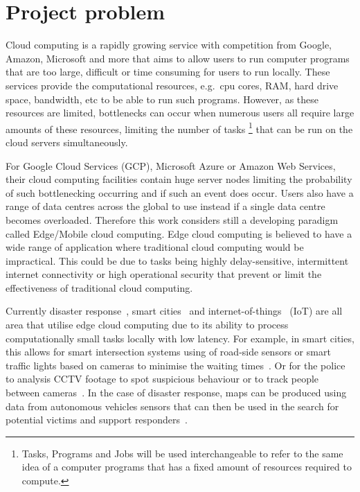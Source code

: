 \chapter{Project problem}\label{ch:project-problem}
Cloud computing is a rapidly growing service with competition from Google, Amazon, Microsoft and more that aims to
allow users to run computer programs that are too large, difficult or time consuming for users to run locally.
These services provide the computational resources, e.g.\ cpu cores, RAM, hard drive space, bandwidth, etc
to be able to run such programs. However, as these resources are limited, bottlenecks can occur when
numerous users all require large amounts of these resources, limiting the number of tasks
\footnote{Tasks, Programs and Jobs will be used interchangeable to refer to the same idea of a computer programs that
has a fixed amount of resources required to compute.} that can be run on the cloud servers simultaneously.

For Google Cloud Services (GCP), Microsoft Azure or Amazon Web Services, their cloud computing facilities contain huge
server nodes limiting the probability of such bottlenecking occurring and if such an event does occur. Users also have
a range of data centres across the global to use instead if a single data centre becomes overloaded.
Therefore this work considers still a developing paradigm~\citep{mobile_edge_survey} called Edge/Mobile cloud computing.
Edge cloud computing is believed to have a wide range of application where traditional cloud computing would be
impractical. This could be due to tasks being highly delay-sensitive, intermittent internet connectivity
or high operational security that prevent or limit the effectiveness of traditional cloud computing.

Currently disaster response~\cite{mobile_edge_disaster}, smart cities~\cite{smart_disaster_management} and
internet-of-things~\citep{mobile_edge_IoT} (IoT) are all area that utilise edge cloud computing due to its ability
to process computationally small tasks locally with low latency. For example, in smart cities, this
allows for smart intersection systems using of road-side sensors or smart traffic lights based
on cameras to minimise the waiting times~\citep{smart_cities_traffic_lights}. Or for the police to analysis
CCTV footage to spot suspicious behaviour or to track people between cameras~\citep{Sreenu2019}. In the case
of disaster response, maps can be produced using data from autonomous vehicles sensors that can then be used in the
search for potential victims and support responders~\citep{smart_disaster_management}.

